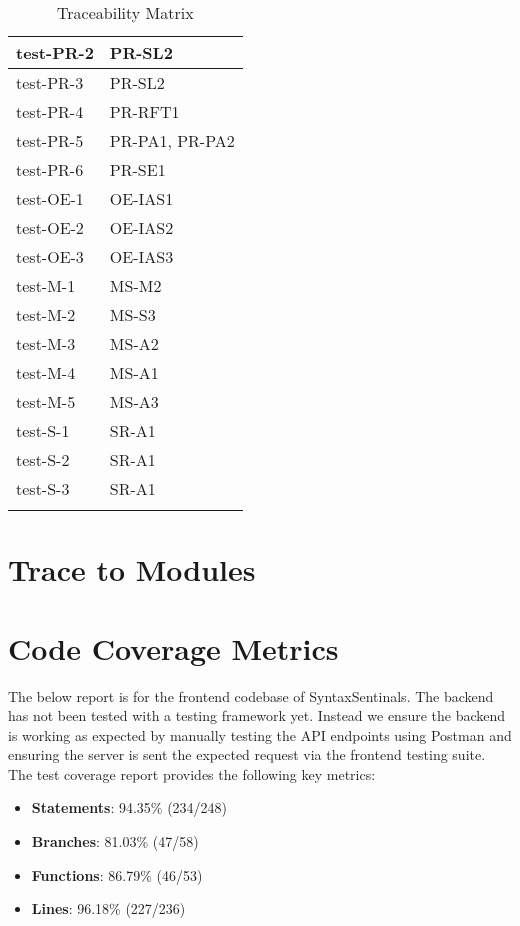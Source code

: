 \documentclass[12pt, titlepage]{article}
\begin{document}
\begin{center}
\begin{longtable}{|>{\centering\arraybackslash}p{4cm}|>{\centering\arraybackslash}p{10cm}|}
    \hline
    test-PR-2 & PR-SL2 \\
    \hline
    test-PR-3 & PR-SL2 \\
    \hline
    test-PR-4 & PR-RFT1 \\
    \hline
    test-PR-5 & PR-PA1, PR-PA2 \\
    \hline
    test-PR-6 & PR-SE1 \\
    \hline
    test-OE-1 & OE-IAS1 \\
    \hline
    test-OE-2 & OE-IAS2 \\
    \hline
    test-OE-3 & OE-IAS3 \\
    \hline
    test-M-1 & MS-M2 \\
    \hline
    test-M-2 & MS-S3 \\
    \hline
    test-M-3 & MS-A2 \\
    \hline
    test-M-4 & MS-A1 \\
    \hline
    test-M-5 & MS-A3 \\
    \hline
    test-S-1 & SR-A1 \\
    \hline
    test-S-2 & SR-A1 \\
    \hline
    test-S-3 & SR-A1 \\
    \hline
  
    \caption{Traceability Matrix}
    \end{longtable}
    \end{center}
		
\section{Trace to Modules}		

\section{Code Coverage Metrics}

The below report is for the frontend codebase of SyntaxSentinals. The backend has not been tested with a testing framework yet.
Instead we ensure the backend is working as expected by manually testing the API endpoints using Postman and ensuring the server is sent the 
expected request via the frontend testing suite. \\

The test coverage report provides the following key metrics:

\begin{itemize}
\item \textbf{Statements}: 94.35\% (234/248)
\item \textbf{Branches}: 81.03\% (47/58)
\item \textbf{Functions}: 86.79\% (46/53)
\item \textbf{Lines}: 96.18\% (227/236)
\end{itemize}
\end{document}
